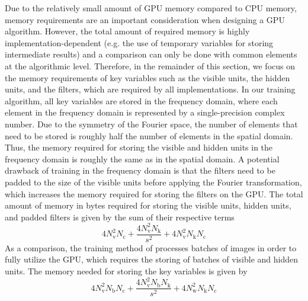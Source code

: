 Due to the relatively small amount of GPU memory compared to CPU memory, memory
requirements are an important consideration when designing a GPU algorithm.
However, the total amount of required memory is highly implementation-dependent
(e.g. the use of temporary variables for storing intermediate results) and a
comparison can only be done with common elements at the algorithmic level.
Therefore, in the remainder of this section, we focus on the memory requirements
of key variables such as the visible units, the hidden units, and the filters,
which are required by all implementations. In our training algorithm, all key
variables are stored in the frequency domain, where each element in the
frequency domain is represented by a single-precision complex number. Due to the
symmetry of the Fourier space, the number of elements that need to be stored is
roughly half the number of elements in the spatial domain. Thus, the memory
required for storing the visible and hidden units in the frequency domain is
roughly the same as in the spatial domain. A potential drawback of training in
the frequency domain is that the filters need to be padded to the size of the
visible units before applying the Fourier transformation, which increases the
memory required for storing the filters on the GPU. The total amount of memory
in bytes required for storing the visible units, hidden units, and padded
filters is given by the sum of their respective terms
\begin{equation} 
4N_\text{v}^2N_\text{c} + \frac{4N_\text{v}^2 N_\text{k}}{s^2} +
4N_\text{v}^2N_\text{k}N_\text{c}
\end{equation}
As a comparison, the training method of \cite{Krizhevsky2012} processes batches
of images in order to fully utilize the GPU, which requires the storing of
batches of visible and hidden units. The memory needed for storing the key
variables is given by
\begin{equation} 
4N_\text{v}^2 N_\text{b}N_\text{c} + \frac{4N_\text{v}^2
N_\text{b}N_\text{k}}{s^2} + 4N_\text{w}^2N_\text{k}N_\text{c}
\end{equation}
